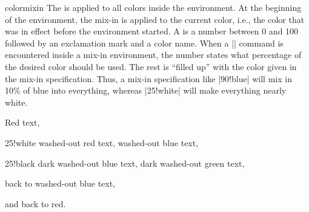 \begin{environment}{{colormixin}}
    The  is applied to all colors inside the environment.
    At the beginning of the environment, the mix-in is applied to the current
    color, i.e., the color that was in effect before the environment started.
    A  is a number between 0 and 100 followed by an
    exclamation mark and a color name. When a |\color| command is encountered
    inside a mix-in environment, the number states what percentage of the
    desired color should be used. The rest is ``filled up'' with the color
    given in the mix-in specification. Thus, a mix-in specification like
    |90!blue| will mix in 10\% of blue into everything, whereas |25!white| will
    make everything nearly white.
\begin{codeexample}[%
  width=4cm,
  preamble={\usepackage{xxcolor}},
  render instead={%
    \begin{minipage}{3.5cm}\raggedright
    \color{red}Red text,
    \begin{colormixin}{25!white}
      washed-out red text,
      \color{blue}washed-out blue text,
      \begin{colormixin}{25!black}
        dark washed-out blue text,
        \color{green}dark washed-out green text,
      \end{colormixin}%
      back to washed-out blue text,
    \end{colormixin}%
    and back to red.
    \end{minipage}%
  }]
\begin{minipage}{3.5cm}\raggedright
\color{red}Red text,
\begin{colormixin}{25!white}
  washed-out red text,
  \color{blue}washed-out blue text,
  \begin{colormixin}{25!black}
    dark washed-out blue text,
    \color{green}dark washed-out green text,
  \end{colormixin}%
  back to washed-out blue text,
\end{colormixin}%
and back to red.
\end{minipage}%
\end{codeexample}
\end{environment}

